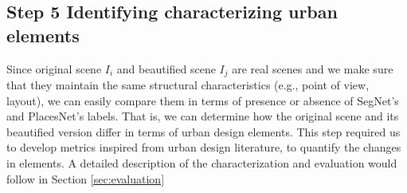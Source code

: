  
\subsection*{Step 5 Identifying  characterizing urban elements}
Since original scene $I_i$ and beautified scene $I_j$ are real scenes and we make sure that they maintain the same structural characteristics (e.g., point of view, layout), we can easily compare them in terms of presence or absence of SegNet's and PlacesNet's labels. That is, we can determine how the original scene and its beautified version differ in terms of urban design elements. This step required us to develop metrics inspired from urban design literature, to quantify the changes in elements. A detailed description of the characterization and evaluation would follow in Section \ref{sec:evaluation}
 
 


